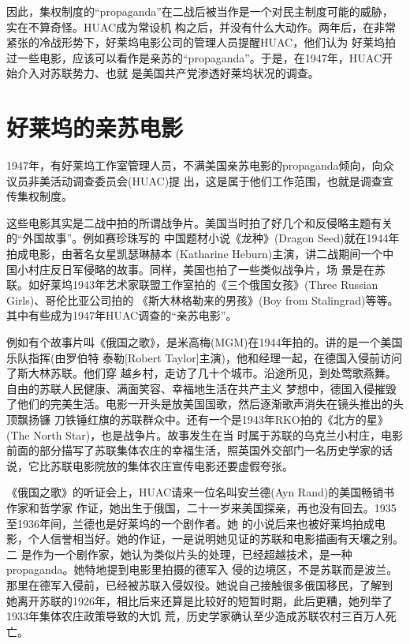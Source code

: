 \documentclass[10pt]{article}
\begin{document}
{因此，集权制度的``propaganda''在二战后被当作是一个对民主制度可能的威胁，实在不算奇怪。HUAC成为常设机
构之后，并没有什么大动作。两年后，在非常紧张的冷战形势下，好莱坞电影公司的管理人员提醒HUAC，他们认为
好莱坞拍过一些电影，应该可以看作是亲苏的``propaganda''。于是，在1947年，HUAC开始介入对苏联势力、也就
是美国共产党渗透好莱坞状况的调查。

\pagebreak
\section{好莱坞的亲苏电影}

1947年，有好莱坞工作室管理人员，不满美国亲苏电影的propaganda倾向，向众议员非美活动调查委员会(HUAC)提
出，这是属于他们工作范围，也就是调查宣传集权制度。

这些电影其实是二战中拍的所谓战争片。美国当时拍了好几个和反侵略主题有关的``外国故事''。例如赛珍珠写的
中国题材小说《龙种》(Dragon Seed)就在1944年拍成电影，由著名女星凯瑟琳\textperiodcentered 赫本
(Katharine Heburn)主演，讲二战期间一个中国小村庄反日军侵略的故事。同样，美国也拍了一些类似战争片，场
景是在苏联。如好莱坞1943年艺术家联盟工作室拍的《三个俄国女孩》(Three Russian Girls)、哥伦比亚公司拍的
《斯大林格勒来的男孩》(Boy from Stalingrad)等等。其中有些成为1947年HUAC调查的``亲苏电影''。

例如有个故事片叫《俄国之歌》，是米高梅(MGM)在1944年拍的。讲的是一个美国乐队指挥(由罗伯特
\textperiodcentered 泰勒$[$Robert Taylor$]$主演)，他和经理一起，在德国入侵前访问了斯大林苏联。他们穿
越乡村，走访了几十个城市。沿途所见，到处莺歌燕舞。自由的苏联人民健康、满面笑容、幸福地生活在共产主义
梦想中，德国入侵摧毁了他们的完美生活。电影一开头是放美国国歌，然后逐渐歌声消失在镜头推出的头顶飘扬镰
刀铁锤红旗的苏联群众中。还有一个是1943年RKO拍的《北方的星》(The North Star)，也是战争片。故事发生在当
时属于苏联的乌克兰小村庄，电影前面的部分描写了苏联集体农庄的幸福生活，照英国外交部门一名历史学家的话
说，它比苏联电影院放的集体农庄宣传电影还要虚假夸张。

《俄国之歌》的听证会上，HUAC请来一位名叫安\textperiodcentered 兰德(Ayn Rand)的美国畅销书作家和哲学家
作证，她出生于俄国，二十一岁来美国探亲，再也没有回去。1935至1936年间，兰德也是好莱坞的一个剧作者。她
的小说后来也被好莱坞拍成电影，个人信誉相当好。她的作证，一是说明她见证的苏联和电影描画有天壤之别。二
是作为一个剧作家，她认为类似片头的处理，已经超越技术，是一种propaganda。她特地提到电影里拍摄的德军入
侵的边境区，不是苏联而是波兰。那里在德军入侵前，已经被苏联入侵奴役。她说自己接触很多俄国移民，了解到
她离开苏联的1926年，相比后来还算是比较好的短暂时期，此后更糟，她列举了1933年集体农庄政策导致的大饥
荒，历史学家确认至少造成苏联农村三百万人死亡。

}
\end{document}
